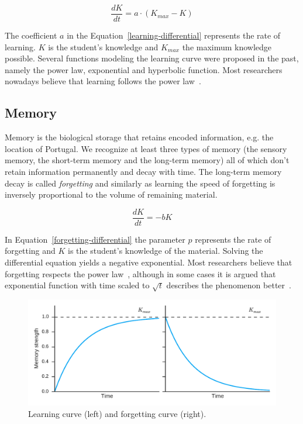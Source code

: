 \begin{equation} \label{learning-differential}
  \frac{dK}{dt} = a \cdot (K_{max} - K)
\end{equation}

The coefficient $a$ in the Equation~\ref{learning-differential} represents the rate of learning. $K$ is the student's knowledge and $K_{max}$ the maximum knowledge possible. Several functions modeling the learning curve were proposed in the past, namely the power law, exponential and hyperbolic function. Most researchers nowadays believe that learning follows the power law~\cite{Klusasek2014}.

\subsection{Memory}
\label{memory}

Memory is the biological storage that retains encoded information, e.g. the location of Portugal. We recognize at least three types of memory (the sensory memory, the short-term memory and the long-term memory) all of which don't retain information permanently and decay with time. The long-term memory decay is called \textit{forgetting} and similarly as learning the speed of forgetting is inversely proportional to the volume of remaining material.

\begin{equation} \label{forgetting-differential}
  \frac{dK}{dt} = -bK
\end{equation}

In Equation~\ref{forgetting-differential} the parameter $p$ represents the rate of forgetting and $K$ is the student's knowledge of the material. Solving the differential equation yields a negative exponential. Most researchers believe that forgetting respects the power law~\cite{MichaelW.Eysenck2008}, although in some cases it is argued that exponential function with time scaled to $\sqrt{t}$ describes the phenomenon better~\cite{White2001}.

\begin{figure}[htbp]
  \centering
  \includegraphics[width=\textwidth]{img/learning-forgetting-curves}
  \caption{Learning curve (left) and forgetting curve (right).}
  \label{fig:learning-forgetting-curves}
\end{figure}

